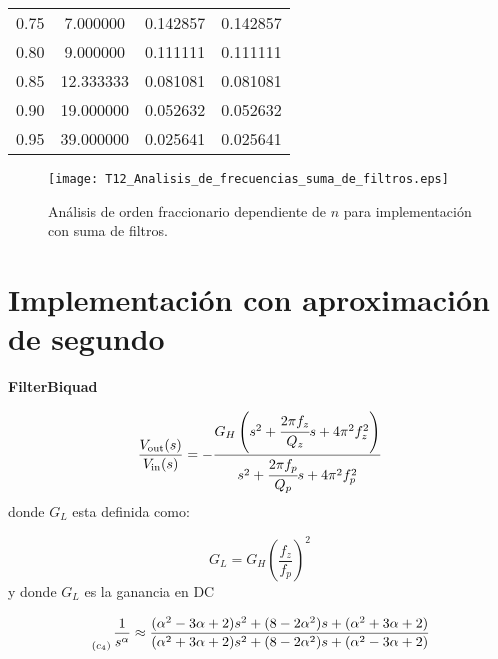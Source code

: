 \begin{table}[!hbp]
\begin{tabular}{cccc}
0.75 & 7.000000 & 0.142857 & 0.142857 \\ 
                                   
0.80 & 9.000000 & 0.111111 & 0.111111 \\ 
                                 
0.85 & 12.333333 & 0.081081 & 0.081081 \\
                                  
0.90 & 19.000000 & 0.052632 & 0.052632 \\
                                  
0.95 & 39.000000 & 0.025641 & 0.025641 \\
\hline                                              
\end{tabular}                                                                
\end{table} 

\begin{figure}[hbtp]
\caption{Análisis de orden fraccionario dependiente de $n$ para implementación con suma de filtros.} 
\label{fig:T12_Analisis_de_frecuencias_suma_de_filtros.eps}
\centering
\texttt{[image: T12\_Analisis\_de\_frecuencias\_suma\_de\_filtros.eps]}
\end{figure}
	
	\section{Implementación con aproximación de segundo}
	
	\textbf{FilterBiquad}
	
	\begin{equation}
		\frac{V_{\mathrm{out}} (s)}{V_{\mathrm{in}}(s)} = - \frac{G_{H} \left(  s^{2} + \cfrac{2 \pi f_{z}}{Q_{z}} s + 4 \pi^{2} f_{z}^{2} \right)}{s^{2} + \cfrac{2 \pi f_{p}}{Q_{p}}s + 4\pi^{2} f_{p}^{2} }
	\end{equation}
	donde $G_{L}$  esta definida como:
	
	\begin{equation}
		G_{L} = G_{H} \left( \frac{f_{z}}{f_{p}} \right)^{2}
	\end{equation}
	y donde $G_{L}$ es la ganancia en DC
	
		\begin{equation}
		\genfrac{}{}{0pt}{0}{}{_{(c_{4})}} \frac{1}{s^{\alpha}} \approx \frac{(\alpha^{2} - 3\alpha + 2) s^{2} + (8 - 2 \alpha^{2})s + (\alpha^{2} + 3\alpha + 2) }{(\alpha^{2} + 3\alpha + 2) s^{2} + (8 - 2 \alpha^{2})s + (\alpha^{2} - 3\alpha + 2)}
		\end{equation}
		
